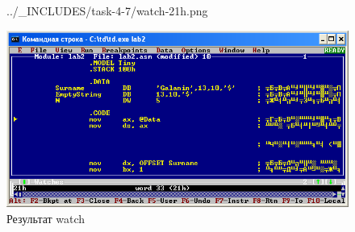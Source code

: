 \begin{figure}[!htp]
\begin {minipage}{0.32\textwidth}
            {../_INCLUDES/task-4-7/watch-21h.png}
        \caption{Пишем watch}
        \label{fig:task_4_7__watches_21h}
    \end{minipage}
    \begin {minipage}{0.32\textwidth}
        \centering
        \includegraphics[width=.99\linewidth]
            {../_INCLUDES/task-4-7/watch-result.png}
        \caption{Результат watch}
        \label{fig:task_4_7__watches_result}
    \end{minipage}
\end{figure}

